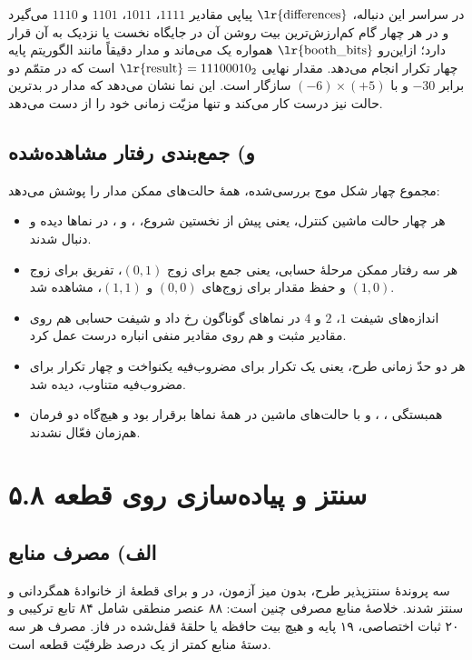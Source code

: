 \documentclass[12pt,a4paper]{article}
\begin{document}
	در سراسر این دنباله، \(\text{\lr{differences}}\) پیاپی مقادیر \(1111\)، \(1011\)، \(1101\) و \(1110\) می‌گیرد و در هر چهار گام کم‌ارزش‌ترین بیت روشن آن در جایگاه نخست یا نزدیک به آن قرار دارد؛ ازاین‌رو \(\text{\lr{booth\_bits}}\) همواره یک می‌ماند و مدار دقیقاً مانند الگوریتم پایه چهار تکرار انجام می‌دهد. مقدار نهایی \(\text{\lr{result}}=11100010_2\) است که در متمّم دو برابر \(-30\) و با \((-6)\times(+5)\) سازگار است. این نما نشان می‌دهد که مدار در بدترین حالت نیز درست کار می‌کند و تنها مزیّت زمانی خود را از دست می‌دهد.

	\subsection*{و) جمع‌بندی رفتار مشاهده‌شده}
	مجموع چهار شکل موج بررسی‌شده، همهٔ حالت‌های ممکن مدار را پوشش می‌دهد:
	\begin{itemize}
		\item هر چهار حالت ماشین کنترل، یعنی  پیش از نخستین شروع، ،  و ، در نماها دیده و دنبال شدند.
		\item هر سه رفتار ممکن مرحلهٔ حسابی، یعنی جمع برای زوج \((0,1)\)، تفریق برای زوج \((1,0)\) و حفظ مقدار برای زوج‌های \((0,0)\) و \((1,1)\)، مشاهده شد.
		\item اندازه‌های شیفت \(1\)، \(2\) و \(4\) در نماهای گوناگون رخ داد و شیفت حسابی هم روی مقادیر مثبت و هم روی مقادیر منفی انباره درست عمل کرد.
		\item هر دو حدّ زمانی طرح، یعنی یک تکرار برای مضروب‌فیه یکنواخت و چهار تکرار برای مضروب‌فیه متناوب، دیده شد.
		\item همبستگی ، ،  و  با حالت‌های ماشین در همهٔ نماها برقرار بود و هیچ‌گاه دو فرمان هم‌زمان فعّال نشدند.
	\end{itemize}

	\section*{۵.۸ سنتز و پیاده‌سازی روی قطعه}
	\subsection*{الف) مصرف منابع}
	سه پروندهٔ سنتز‌پذیر طرح، بدون میز آزمون، در  و برای قطعهٔ  از خانوادهٔ  همگردانی و سنتز شدند. خلاصهٔ منابع مصرفی چنین است: ۸۸ عنصر منطقی شامل ۸۴ تابع ترکیبی و ۲۰ ثبات اختصاصی، ۱۹ پایه و هیچ بیت حافظه یا حلقهٔ قفل‌شده در فاز. مصرف هر سه دستهٔ منابع کمتر از یک درصد ظرفیّت قطعه است.
\end{document}
